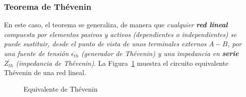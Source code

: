 \subsubsection{Teorema de Thévenin}
En este caso, el teorema se generaliza, de manera que \textit{cualquier \textbf{red lineal} compuesta por elementos pasivos y activos (dependientes o independientes) se puede sustituir, desde el punto de vista de unos terminales externos $A-B$, por una fuente de tensión $\overline{\epsilon_{th}}$ (generador de Thévenin) y una impedancia en \textbf{serie} $\overline{Z_{th}}$ (impedancia de Thévenin)}. La Figura~\ref{fig.thevenin_ca} muestra el circuito equivalente Thévenin de una red lineal. 
\begin{figure}[H]
        \centering
        \hfil
        \caption{Equivalente de Thévenin}
        \label{fig.thevenin_ca}
    \end{figure}
     

